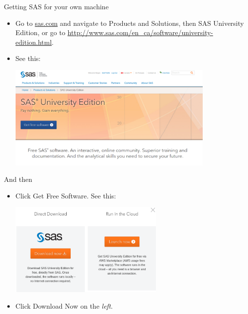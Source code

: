 \documentclass[unknownkeysallowed]{beamer}\usepackage[]{graphicx}\usepackage[]{color}
\begin{document}
\begin{frame}[fragile]{Getting SAS for your own machine}
  
  \begin{itemize}
  \item Go to \url{sas.com} and navigate to Products and Solutions,
    then SAS University Edition, or
    go to \url{http://www.sas.com/en_ca/software/university-edition.html}.
  \item See this:
    
    \includegraphics[width=4in]{sas16}
  \end{itemize}
  
\end{frame}

\begin{frame}[fragile]{And then}
  
  \begin{itemize}
  \item Click Get Free Software. See this:
    
    \includegraphics[width=3in]{sas28}
    
  \item Click Download Now on the \emph{left}.
  \end{itemize}
  
\end{frame}
\end{document}
